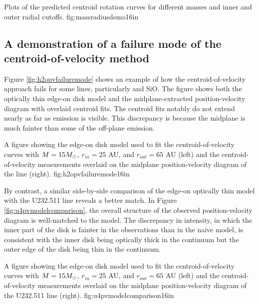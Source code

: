 \documentclass[twocolumn]{aastex61}
\begin{document}
{Plots of the predicted centroid rotation curves for different masses
and inner and outer radial cutoffs.}
{fig:massradiusdemo}{1}{6in}


\subsection{A demonstration of a failure mode of the centroid-of-velocity method}
Figure \ref{fig:h2opvfailuremode} shows an example of how the centroid-of-velocity
approach fails for some lines, particularly \water and SiO.  The figure shows both
the optically thin edge-on disk model and the midplane-extracted position-velocity
diagram with overlaid centroid fits.  The centroid fits notably do not extend nearly
as far as emission is visible.  This discrepancy is because the midplane is much fainter
than some of the off-plane emission.

{A figure showing the edge-on disk model used to fit the centroid-of-velocity curves with
$M=15 M_{\odot}$, $r_{in}=25$ AU, and $r_{out}=65$ AU (left) and the centroid-of-velocity measurements
overlaid on the midplane position-velocity diagram of the \water line (right).}
{fig:h2opvfailuremode}{1}{6in}

By contrast, a similar side-by-side comparison of the edge-on optically thin
model with the U232.511 line reveals a better match.  In Figure
\ref{fig:u4pvmodelcomparison}, the overall structure of the observed
position-velocity diagram is well-matched to the model.  The discrepancy in
intensity, in which the inner part of the disk is fainter in the observations
than in the naive model, is consistent with the inner disk being optically
thick in the continuum but the outer edge of the disk being thin in the
continuum.

{A figure showing the edge-on disk model used to fit the centroid-of-velocity curves with
$M=15 M_{\odot}$, $r_{in}=25$ AU, and $r_{out}=65$ AU (left) and the centroid-of-velocity measurements
overlaid on the midplane position-velocity diagram of the U232.511 line (right).}
{fig:u4pvmodelcomparison}{1}{6in}
\end{document}
